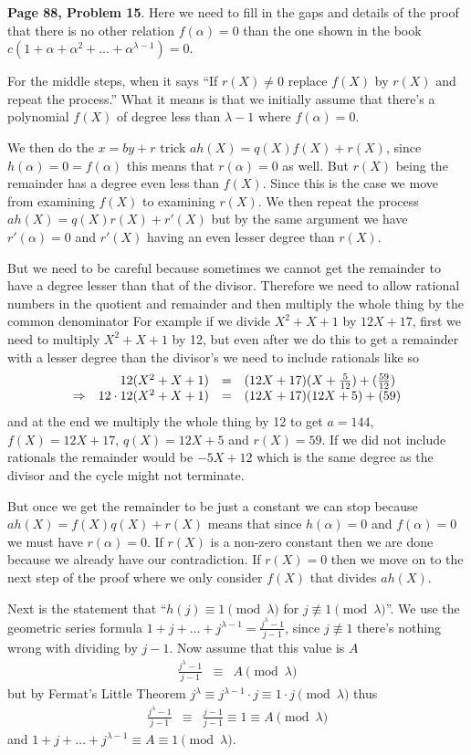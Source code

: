 \documentclass[aps,preprint,preprintnumbers,nofootinbib,showpacs,prd]{revtex4-1}
\newcommand{\nbea}{\begin{eqnarray*}}
\newcommand{\neea}{\end{eqnarray*}}
\begin{document}
{\bf Page 88, Problem 15}. Here we need to fill in the gaps and details of the proof that there is no other relation $f(\alpha) = 0$ than the one shown in the book $c(1 + \alpha + \alpha^2 + \dots + \alpha^{\lambda-1}) = 0$.

For the middle steps, when it says ``If $r(X) \neq 0$ replace $f(X)$ by $r(X)$ and repeat the process.'' What it means is that we initially assume that there's a polynomial $f(X)$ of degree less than $\lambda - 1$ where $f(\alpha) = 0$.

We then do the $x = by + r$ trick $ah(X) = q(X)f(X) + r(X)$, since $h(\alpha) = 0 = f(\alpha)$ this means that $r(\alpha) = 0$ as well. But $r(X)$ being the remainder has a degree even less than $f(X)$. Since this is the case we move from examining $f(X)$ to examining $r(X)$. We then repeat the process $ah(X) = q(X)r(X) + r'(X)$ but by the same argument we have $r'(\alpha) = 0$ and $r'(X)$ having an even lesser degree than $r(X)$. 

But we need to be careful because sometimes we cannot get the remainder to have a degree lesser than that of the divisor. Therefore we need to allow rational numbers in the quotient and remainder and then multiply the whole thing by the common denominator  For example if we divide $X^2 + X + 1$ by $12X + 17$, first we need to multiply $X^2 + X + 1$ by 12, but even after we do this to get a remainder with a lesser degree than the divisor's we need to include rationals like so
%
\nbea
\begin{array}{c r c l}
& 12(X^2 + X + 1) & = & (12X + 17)(X + \tfrac{5}{12}) + (\tfrac{59}{12}) \\
\Rightarrow & 12\cdot12(X^2 + X + 1) & = & (12X + 17)(12X + 5) + (59)
\end{array}
\neea
%
and at the end we multiply the whole thing by 12 to get $a = 144$, $f(X) = 12X + 17$, $q(X) = 12X + 5$ and $r(X) = 59$. If we did not include rationals the remainder would be $-5X + 12$ which is the same degree as the divisor and the cycle might not terminate.

But once we get the remainder to be just a constant we can stop because $ah(X) = f(X)q(X) + r(X)$ means that since $h(\alpha) = 0$ and $f(\alpha) = 0$ we must have $r(\alpha) = 0$. If $r(X)$ is a non-zero constant then we are done because we already have our contradiction. If $r(X) = 0$ then we move on to the next step of the proof where we only consider $f(X)$ that divides $ah(X)$.

Next is the statement that ``$h(j) \equiv 1 \pmod{\lambda}$ for $j \not\equiv 1 \pmod{\lambda}$''. We use the geometric series formula $1 + j + \dots + j^{\lambda - 1} = \frac{j^\lambda - 1}{j - 1}$, since $j \not\equiv 1$ there's nothing wrong with dividing by $j - 1$. Now assume that this value is $A$
%
\nbea
\frac{j^\lambda - 1}{j - 1} & \equiv & A \pmod{\lambda}
\neea
%
but by Fermat's Little Theorem $j^{\lambda} \equiv j^{\lambda - 1}\cdot j \equiv 1 \cdot j \pmod{\lambda}$ thus 
%
\nbea
\frac{j^\lambda - 1}{j - 1} & \equiv & \frac{j - 1}{j - 1} \equiv 1 \equiv A \pmod{\lambda}
\neea
%
and $1 + j + \dots + j^{\lambda - 1} \equiv A \equiv 1 \pmod{\lambda}$.
\end{document}
